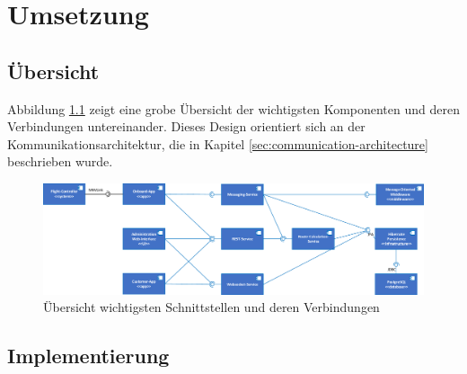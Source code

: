 \newpage
\chapter{Umsetzung}

\section{Übersicht}

Abbildung \ref{fig:component-overview} zeigt eine grobe Übersicht der wichtigsten Komponenten und deren Verbindungen untereinander. Dieses Design orientiert sich an der Kommunikationsarchitektur, die in Kapitel \ref{sec:communication-architecture} beschrieben wurde.

\begin{figure}[H]
	\includegraphics[width=1.0\textwidth]{images/component-overview.pdf}
	\caption{Übersicht wichtigsten Schnittstellen und deren Verbindungen }
	\label{fig:component-overview}
\end{figure}
\section{Implementierung}

